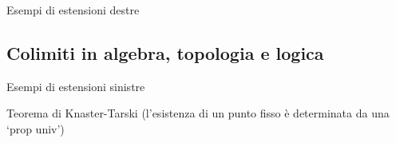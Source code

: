 \begin{example}
\end{example}
\begin{example}
\end{example}
\begin{example}
\end{example}
\begin{example}
\end{example}
\begin{example}
\end{example}
\begin{example}
\end{example}
\begin{example}
\end{example}
\begin{examples}
	Esempi di estensioni destre
\end{examples}
\subsection{Colimiti in algebra, topologia e logica}
\begin{example}
\end{example}
\begin{example}
	\Todo{}
\end{example}
\begin{example}
\end{example}
\begin{example}
\end{example}
\begin{example}
\end{example}
\begin{example}
\end{example}
\begin{example}
\end{example}
\begin{example}
\end{example}
\begin{example}
\end{example}
\begin{example}
\end{example}
\begin{examples}
	Esempi di estensioni sinistre
\end{examples}
\begin{theorem}
	Teorema di Knaster-Tarski (l'esistenza di un punto fisso è determinata da una `prop univ')
\end{theorem}
\color{black}
